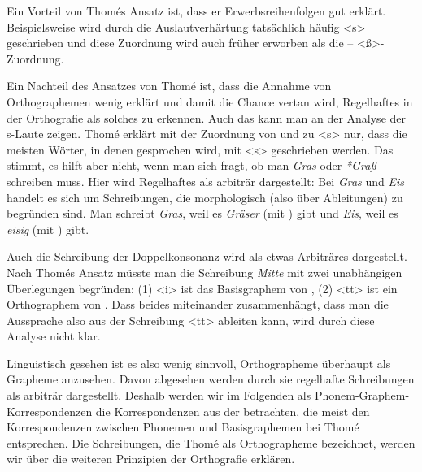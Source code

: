 \largerpage
Ein Vorteil von Thomés Ansatz ist, dass er Erwerbsreihenfolgen gut erklärt. Beispielsweise wird  durch die Auslautverhärtung tatsächlich häufig <s> geschrieben und diese Zuordnung wird auch früher erworben als die  -- <ß>-Zuordnung.

\largerpage
Ein Nachteil des Ansatzes von Thomé ist, dass die Annahme von Orthographemen wenig erklärt und damit die Chance vertan wird, Regelhaftes in der Orthografie als solches zu erkennen. Auch das kann man an der Analyse der s-Laute zeigen. Thomé erklärt mit der Zuordnung von  und  zu <s> nur, dass die meisten Wörter, in denen \textipa{[s]} gesprochen wird, mit <s> geschrieben werden. Das stimmt, es hilft aber nicht, wenn man sich fragt, ob man \textit{Gras} oder \textit{*Graß} schreiben muss. Hier wird Regelhaftes als arbiträr dargestellt: Bei \textit{Gras} und \textit{Eis} handelt es sich um Schreibungen, die morphologisch (also über Ableitungen) zu begründen sind. Man schreibt \textit{Gras}, weil es \textit{Gräser} (mit \textipa{[z]}) gibt und \textit{Eis}, weil es \textit{eisig} (mit \textipa{[z]}) gibt.

\newpage
Auch die Schreibung der Doppelkonsonanz wird als etwas Arbiträres dargestellt. Nach Thomés Ansatz müsste man die Schreibung \textit{Mitte} mit zwei unabhängigen Überlegungen begründen: (1) <i> ist das Basisgraphem von , (2) <tt> ist ein Orthographem von . Dass beides miteinander zusammenhängt, dass man die Aussprache  also aus der Schreibung <tt> ableiten kann, wird durch diese Analyse nicht klar.

Linguistisch gesehen ist es also wenig sinnvoll, Orthographeme überhaupt als Grapheme anzusehen. Davon abgesehen werden durch sie regelhafte Schreibungen als arbiträr dargestellt. Deshalb werden wir im Folgenden als Phonem-Graphem-Korrespondenzen die Korrespondenzen aus der \citet[]{Duden2022} betrachten, die meist den Korrespondenzen zwischen Phonemen und Basisgraphemen bei Thomé entsprechen. Die Schreibungen, die Thomé als Orthographeme bezeichnet, werden wir über die weiteren Prinzipien der Orthografie erklären.

